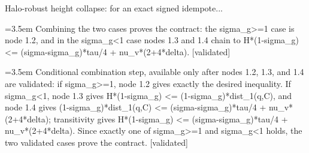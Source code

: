 \documentclass{article}
\newcommand{\step}[1]{\par\noindent\hangindent=3.5em\hangafter=1%
  \makebox[3.5em][l]{\textbf{#1.}}}
\newcommand{\steptag}[1]{\hfill{\small\textsf{[#1]}}}
\begin{document}
\begin{proofbox}{Halo-robust height collapse: for an exact signed idempote...}
\step{1.5} Combining the two cases proves the contract: the sigma\_g>=1 case is node 1.2, and in the sigma\_g<1 case nodes 1.3 and 1.4 chain to H*(1-sigma\_g) <= (sigma-sigma\_g)*tau/4 + nu\_v*(2+4*delta). \steptag{validated} \\[6pt]
\step{1.5.1} Conditional combination step, available only after nodes 1.2, 1.3, and 1.4 are validated: if sigma\_g>=1, node 1.2 gives exactly the desired inequality. If sigma\_g<1, node 1.3 gives H*(1-sigma\_g) <= (1-sigma\_g)*dist\_1(q,C), and node 1.4 gives (1-sigma\_g)*dist\_1(q,C) <= (sigma-sigma\_g)*tau/4 + nu\_v*(2+4*delta); transitivity gives H*(1-sigma\_g) <= (sigma-sigma\_g)*tau/4 + nu\_v*(2+4*delta). Since exactly one of sigma\_g>=1 and sigma\_g<1 holds, the two validated cases prove the contract. \steptag{validated} \\[4pt]
\end{proofbox}
\end{document}
